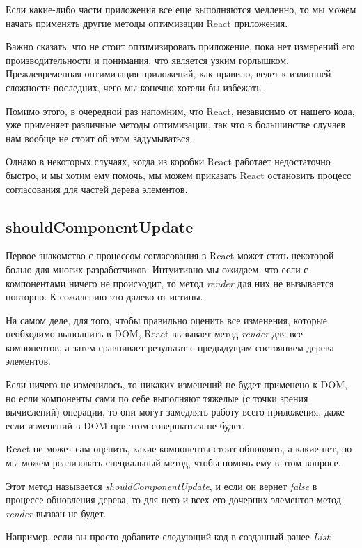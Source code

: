 Если какие-либо части приложения все еще выполняются медленно, то мы можем начать применять другие методы оптимизации React приложения.

Важно сказать, что не стоит оптимизировать приложение, пока нет измерений его производительности и понимания, что является узким горлышком. Преждевременная оптимизация приложений, как правило, ведет к излишней сложности последних, чего мы конечно хотели бы избежать. 

Помимо этого, в очередной раз напомним, что React, независимо от нашего кода, уже применяет различные методы оптимизации, так что в большинстве случаев нам вообще не стоит об этом задумываться.

Однако в некоторых случаях, когда из коробки React работает недостаточно быстро, и мы хотим ему помочь, мы можем приказать React остановить процесс согласования для частей дерева элементов.

\subsection{shouldComponentUpdate}

Первое знакомство с процессом согласования в React может стать некоторой болью для многих разработчиков. Интуитивно мы ожидаем, что если с компонентами ничего не происходит, то метод \textit{render} для них не вызывается повторно. К сожалению это далеко от истины.

На самом деле, для того, чтобы правильно оценить все изменения, которые необходимо выполнить в DOM, React вызывает метод \textit{render} для все компонентов, а затем сравнивает результат с предыдущим состоянием дерева элементов.

Если ничего не изменилось, то никаких изменений не будет применено к DOM, но если компоненты сами по себе выполняют тяжелые (с точки зрения вычислений) операции, то они могут замедлять работу всего приложения, даже если изменений в DOM при этом совершаться не будет.

React не может сам оценить, какие компоненты стоит обновлять, а какие нет, но мы можем реализовать специальный метод, чтобы помочь ему в этом вопросе.

Этот метод называется \textit{shouldComponentUpdate}, и если он вернет \textit{false} в процессе обновления дерева, то для него и всех его дочерних элементов метод \textit{render} вызван не будет.


Например, если вы просто добавите следующий код в созданный ранее \textit{List}:

